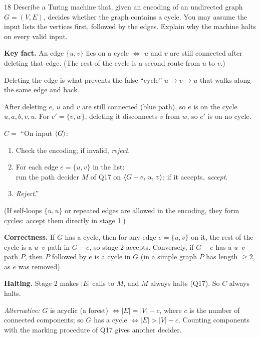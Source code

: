 \begin{question}{18}
Describe a Turing machine that, given an encoding of an undirected graph $G=(V,E)$, decides whether the graph contains a cycle. You may assume the input lists the vertices first, followed by the edges. Explain why the machine halts on every valid input.
\end{question}
\begin{soln}
\textbf{Key fact.} An edge $\{u,v\}$ lies on a cycle $\iff$ $u$ and $v$ are still connected after deleting that edge. (The rest of the cycle is a second route from $u$ to $v$.)

Deleting the edge is what prevents the false ``cycle'' $u\to v\to u$ that walks along the same edge and back.

\begin{center}

{\footnotesize After deleting $e$, $u$ and $v$ are still connected (blue path), so $e$ is on the cycle $u,a,b,v,u$. For $e'=\{v,w\}$, deleting it disconnects $v$ from $w$, so $e'$ is on no cycle.}
\end{center}

$C=$ ``On input $\langle G\rangle$:
\begin{enumerate}
\item Check the encoding; if invalid, \emph{reject}.
\item For each edge $e=\{u,v\}$ in the list:\\
\hspace*{1.5em}run the path decider $M$ of Q17 on $\langle G-e,\,u,\,v\rangle$; if it accepts, \emph{accept}.
\item \emph{Reject}.''
\end{enumerate}
(If self-loops $\{u,u\}$ or repeated edges are allowed in the encoding, they form cycles: accept them directly in stage 1.)

\textbf{Correctness.} If $G$ has a cycle, then for any edge $e=\{u,v\}$ on it, the rest of the cycle is a $u$--$v$ path in $G-e$, so stage 2 accepts. Conversely, if $G-e$ has a $u$--$v$ path $P$, then $P$ followed by $e$ is a cycle in $G$ (in a simple graph $P$ has length $\ge2$, as $e$ was removed).

\textbf{Halting.} Stage 2 makes $|E|$ calls to $M$, and $M$ always halts (Q17). So $C$ always halts.

\emph{Alternative:} $G$ is acyclic (a forest) $\iff |E|=|V|-c$, where $c$ is the number of connected components; so $G$ has a cycle $\iff |E|>|V|-c$. Counting components with the marking procedure of Q17 gives another decider.
\end{soln}

